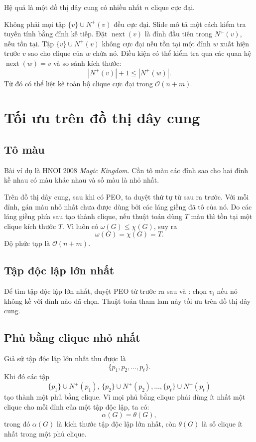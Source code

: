\documentclass[11pt]{article}
\newcommand{\Oh}{\mathcal{O}}
\newcommand{\Next}{\operatorname{next}}
\begin{document}
Hệ quả là một đồ thị dây cung có nhiều nhất \(n\) clique cực đại.

Không phải mọi tập \(\{v\}\cup N^+(v)\) đều cực đại. Slide mô tả một cách
kiểm tra tuyến tính bằng đỉnh kế tiếp. Đặt \(\Next(v)\) là đỉnh đầu tiên trong
\(N^+(v)\), nếu tồn tại. Tập \(\{v\}\cup N^+(v)\) không cực đại nếu tồn tại
một đỉnh \(w\) xuất hiện trước \(v\) sao cho clique của \(w\) chứa nó. Điều
kiện có thể kiểm tra qua các quan hệ \(\Next(w)=v\) và so sánh kích thước:
\[
  |N^+(v)|+1\le |N^+(w)|.
\]
Từ đó có thể liệt kê toàn bộ clique cực đại trong \(\Oh(n+m)\).

\section{Tối ưu trên đồ thị dây cung}

\subsection{Tô màu}

Bài ví dụ là HNOI 2008 \emph{Magic Kingdom}. Cần tô màu các đỉnh sao cho hai
đỉnh kề nhau có màu khác nhau và số màu là nhỏ nhất.

Trên đồ thị dây cung, sau khi có PEO, ta duyệt thứ tự từ sau ra trước. Với
mỗi đỉnh, gán màu nhỏ nhất chưa được dùng bởi các láng giềng đã tô của nó.
Do các láng giềng phía sau tạo thành clique, nếu thuật toán dùng \(T\) màu
thì tồn tại một clique kích thước \(T\). Vì luôn có
\(\omega(G)\le \chi(G)\), suy ra
\[
  \omega(G)=\chi(G)=T.
\]
Độ phức tạp là \(\Oh(n+m)\).

\subsection{Tập độc lập lớn nhất}

Để tìm tập độc lập lớn nhất, duyệt PEO từ trước ra sau và : chọn \(v_i\) nếu nó không kề với đỉnh nào đã chọn. Thuật toán tham lam
này tối ưu trên đồ thị dây cung.

\subsection{Phủ bằng clique nhỏ nhất}

Giả sử tập độc lập lớn nhất thu được là
\[
  \{p_1,p_2,\ldots,p_t\}.
\]
Khi đó các tập
\[
  \{p_1\}\cup N^+(p_1),\,
  \{p_2\}\cup N^+(p_2),\ldots,
  \{p_t\}\cup N^+(p_t)
\]
tạo thành một phủ bằng clique. Vì mọi phủ bằng clique phải dùng ít nhất một
clique cho mỗi đỉnh của một tập độc lập, ta có:
\[
  \alpha(G)=\theta(G),
\]
trong đó \(\alpha(G)\) là kích thước tập độc lập lớn nhất, còn
\(\theta(G)\) là số clique ít nhất trong một phủ clique.
\end{document}
